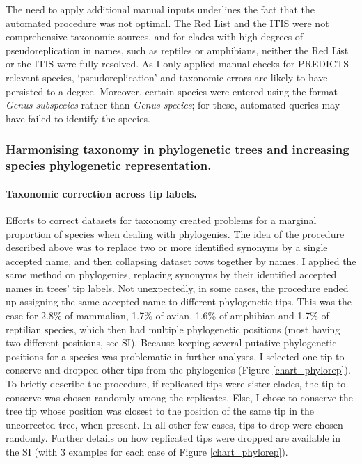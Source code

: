 The need to apply additional manual inputs underlines the fact that the automated procedure was not optimal. The Red List and the ITIS were not comprehensive taxonomic sources, and for clades with high degrees of pseudoreplication in names, such as reptiles or amphibians, neither the Red List or the ITIS were fully resolved. As I only applied manual checks for PREDICTS relevant species, `pseudoreplication' and taxonomic errors are likely to have persisted to a degree. Moreover, certain species were entered using the format \textit{Genus subspecies} rather than \textit{Genus species}; for these, automated queries may have failed to identify the species.



\subsubsection{Harmonising taxonomy in phylogenetic trees and increasing species phylogenetic representation.}

\paragraph{Taxonomic correction across tip labels.} 
Efforts to correct datasets for taxonomy created problems for a marginal proportion of species when dealing with phylogenies. The idea of the procedure described above was to replace two or more identified synonyms by a single accepted name, and then collapsing dataset rows together by names. I applied the same method on phylogenies, replacing synonyms by their identified accepted names in trees' tip labels. Not unexpectedly, in some cases, the procedure ended up assigning the same accepted name to different phylogenetic tips. This was the case for 2.8\% of mammalian, 1.7\% of avian, 1.6\% of amphibian and  1.7\% of reptilian species, which then had multiple phylogenetic positions (most having two different positions, see SI). Because keeping several putative phylogenetic positions for a species was problematic in further analyses, I selected one tip to conserve and dropped other tips from the phylogenies (Figure \ref{chart_phylorep}). To briefly describe the procedure, if replicated tips were sister clades, the tip to conserve was chosen randomly among the replicates. Else, I chose to conserve the tree tip whose position was closest to the position of the same tip in the uncorrected tree, when present. In all other few cases, tips to drop were chosen randomly. Further details on how replicated tips were dropped are available in the SI (with 3 examples for each case of Figure \ref{chart_phylorep}).

